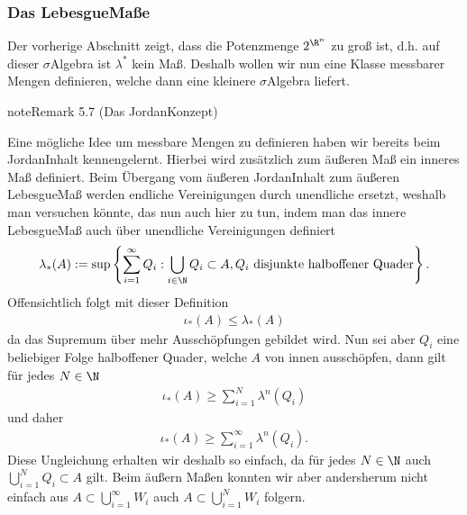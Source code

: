 \documentclass[letterpaper,10pt,german]{jupyterBook}
\begin{document}
\subsubsection{Das Lebesgue\sphinxhyphen{}Maße}
\label{\detokenize{masstheorie/masstheorie:das-lebesgue-masze}}
\sphinxAtStartPar
Der vorherige Abschnitt zeigt, dass die Potenzmenge \(2^{\R^n}\) zu groß ist, d.h. auf dieser \(\sigma\)\sphinxhyphen{}Algebra ist \(\lambda^\ast\) kein Maß. Deshalb wollen wir nun eine Klasse messbarer Mengen definieren, welche dann eine kleinere \(\sigma\)\sphinxhyphen{}Algebra liefert.
\label{masstheorie/masstheorie:remark-40}
\begin{sphinxadmonition}{note}{Remark 5.7 (Das Jordan\sphinxhyphen{}Konzept)}



\sphinxAtStartPar
Eine mögliche Idee um messbare Mengen zu definieren haben wir bereits beim Jordan\sphinxhyphen{}Inhalt kennengelernt. Hierbei wird zusätzlich zum äußeren Maß ein inneres Maß definiert. Beim Übergang vom äußeren Jordan\sphinxhyphen{}Inhalt zum äußeren Lebesgue\sphinxhyphen{}Maß werden endliche Vereinigungen durch unendliche ersetzt, weshalb man versuchen könnte, das nun auch hier zu tun, indem man das innere Lebesgue\sphinxhyphen{}Maß auch über unendliche Vereinigungen definiert
\begin{equation*}
\begin{split}\lambda_\ast(A) := \sup\left\{\sum_{i=1}^\infty Q_i: \bigcup_{i\in\N} Q_i \subset A, Q_i\text{ disjunkte halboffener Quader}\right\}.\end{split}
\end{equation*}
\sphinxAtStartPar
Offensichtlich folgt mit dieser Definition
\begin{equation*}
\begin{split}\iota_\ast(A)\leq \lambda_\ast(A)\end{split}
\end{equation*}
\sphinxAtStartPar
da das Supremum über mehr Ausschöpfungen gebildet wird. Nun sei aber \(Q_i\) eine beliebiger Folge halboffener Quader, welche \(A\) von innen ausschöpfen, dann gilt für jedes \(N\in\N\)
\begin{equation*}
\begin{split}\iota_\ast(A) \geq \sum_{i=1}^N \lambda^n(Q_i)\end{split}
\end{equation*}
\sphinxAtStartPar
und daher
\begin{equation*}
\begin{split}\iota_\ast(A)\geq \sum_{i=1}^\infty \lambda^n(Q_i).\end{split}
\end{equation*}
\sphinxAtStartPar
Diese Ungleichung erhalten wir deshalb so einfach, da für jedes \(N\in\N\) auch \(\bigcup_{i=1}^N Q_i\subset A\) gilt. Beim äußern Maßen konnten wir aber andersherum nicht einfach aus \(A\subset \bigcup_{i=1}^\infty W_i\) auch \(A\subset \bigcup_{i=1}^N W_i\) folgern.


\end{sphinxadmonition}
\end{document}
